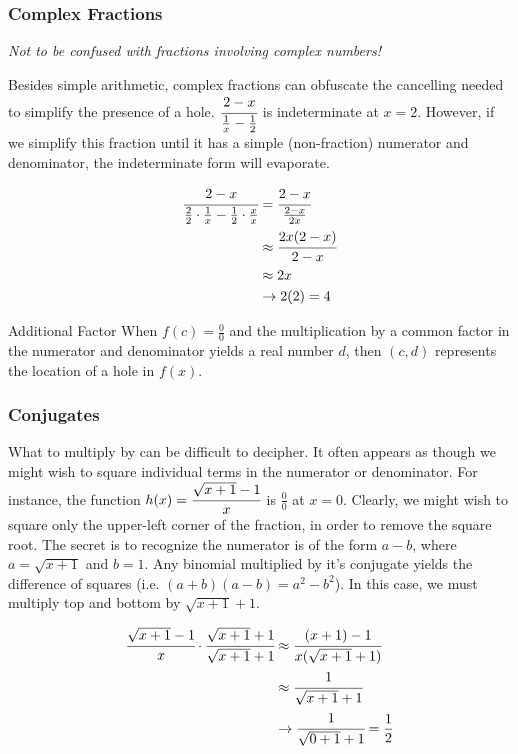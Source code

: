 \subsubsection{Complex Fractions}
\emph{Not to be confused with fractions involving complex numbers!}

Besides simple arithmetic, complex fractions can obfuscate the cancelling 
needed to simplify the presence
of a hole.  $\cfrac{2-x}{\frac{1}{x}-\frac{1}{2}}$ is indeterminate at $x=2$.  
However, if we simplify this fraction until it has a simple (non-fraction) numerator and 
denominator, the indeterminate form will evaporate.


\begin{align*}
\cfrac{2-x}{\frac{2}{2}\cdot\frac{1}{x}-\frac{1}{2}\cdot\frac{x}{x}} &= \cfrac{2-x}{\frac{2-x}{2x}} \\
&\approx \cfrac{2x(2-x)}{2-x} \\
&\approx 2x\\
&\rightarrow 2(2) = 4
\end{align*}



\begin{derivation}{Additional Factor}
When $f(c)=\frac{0}{0}$ and the multiplication by a common factor in the numerator and denominator yields a real number $d$,
then $(c,d)$ represents the location of a hole in $f(x)$.
\end{derivation}



\subsubsection{Conjugates}
What to multiply by can be difficult to decipher.  It often appears as though we might wish to square individual terms 
in the numerator or denominator.  For instance, the function $h(x) = \cfrac{\sqrt{x+1}-1}{x}$ is $\frac{0}{0}$ at $x=0$.
Clearly, we might wish to square only the upper-left corner of the fraction, in order to remove the square root.  The
secret is to recognize the numerator is of the form $a-b$, where $a=\sqrt{x+1}$ and $b=1$.  Any binomial multiplied
by it's conjugate yields the difference of squares (i.e. $(a+b)(a-b)=a^2-b^2$).  In this case, we must multiply top and
bottom by $\sqrt{x+1}+1$.


\begin{align*}
\cfrac{\sqrt{x+1}-1}{x} \cdot \cfrac{\sqrt{x+1}+1}{\sqrt{x+1}+1} &\approx \cfrac{(x+1)-1}{x(\sqrt{x+1}+1)}\\
&\approx \cfrac{1}{\sqrt{x+1}+1}\\
&\rightarrow \cfrac{1}{\sqrt{0+1}+1} = \frac{1}{2}
\end{align*}

